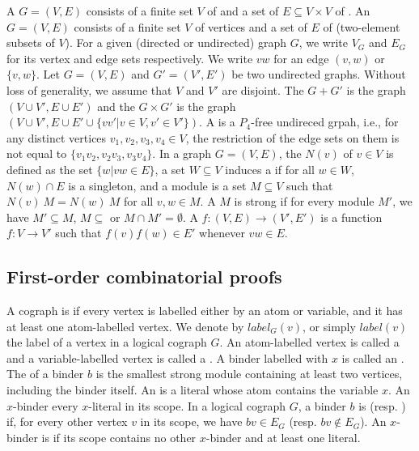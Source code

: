 \documentclass[conference]{IEEEtran}
\theoremstyle{definition}
\begin{document}
A  $G = (V, E)$ consists of a finite set $V$ of
 and a set of $E \subseteq V \times V$ of . An
 $G = (V, E)$ consists of a finite set $V$ of vertices
and a set of $E$ of  (two-element subsets of $V$).
For a given (directed or undirected) graph $G$, we write $V_G$ and $E_G$ for its
vertex and edge sets respectively. We write $vw$ for an edge $(v, w)$ or $\{v,
w\}$. Let $G = (V, E)$ and $G' = (V', E')$ be two undirected graphs. Without
loss of generality, we assume that $V$ and $V'$ are disjoint. The 
$G + G'$ is the graph $(V \cup V', E \cup E')$ and the  $G \times G'$
is the graph $(V \cup V', E \cup E' \cup \{vv' | v \in V, v' \in V'\})$. A
 is a $P_4$-free undireced grpah, i.e., for any distinct vertices $v_1,
v_2, v_3, v_4 \in V$, the restriction of the edge sets on them is not equal to
$\{v_1v_2, v_2v_3, v_3v_4\}$. In a graph $G = (V, E)$, the 
$N(v)$ of $v \in V$ is defined as the set $\{w | vw \in E\}$, a set $W \subseteq
V$ induces a  if for all $w \in W$, $N(w) \cap E$ is a singleton, and a module is a
set $M \subseteq V$ such that $N(v) \ M = N(w) \ M$ for all $v, w \in M$. A
 $M$ is strong if for every module $M'$, we have $M' \subseteq M$, $M
\subseteq$ or $M \cap M' = \emptyset$. A  $f: (V, E)
\rightarrow (V', E')$ is a function $f : V \rightarrow V'$ such that $f(v)f(w)
\in E'$ whenever $vw \in E$.

\subsection{First-order combinatorial proofs}
A cograph is  if every vertex is labelled either by an atom or variable,
and it has at least one atom-labelled vertex. We denote by $label_G(v)$, or simply
$label(v)$ the label of a vertex in a logical cograph $G$. An atom-labelled vertex is called
a  and a variable-labelled vertex is called a . A
binder labelled with $x$ is called an . The  of a binder
$b$ is the smallest strong module containing at least two vertices, including
the binder itself. An  is a literal whose atom contains the variable $x$. An $x$-binder  every $x$-literal in its scope.
In a logical cograph $G$, a binder $b$ is  (resp. ) if, for every other
vertex $v$ in its scope, we have $bv \in E_G$ (resp. $bv \notin E_G$). An
$x$-binder is  if its scope contains no other $x$-binder and at least one
literal. 
\end{document}
